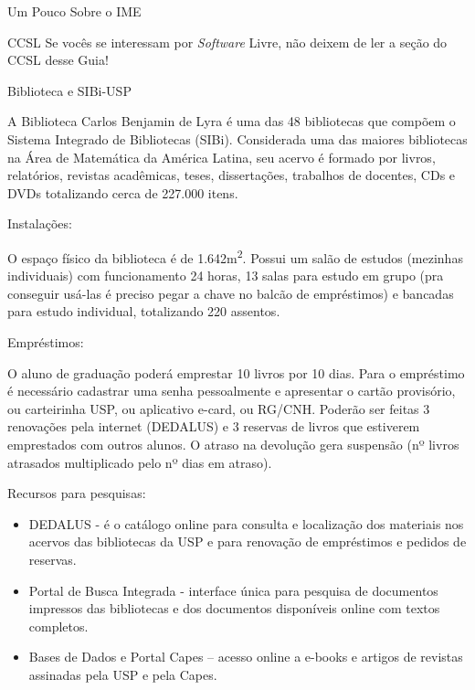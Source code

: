 \begin{secao}{Um Pouco Sobre o IME}
\begin{subsecao}{CCSL}
Se vocês se interessam por \textit{Software} Livre, não deixem de ler a seção
do CCSL desse Guia!

\end{subsecao}



\begin{subsecao}{Biblioteca e SIBi-USP}

A Biblioteca Carlos Benjamin de Lyra é uma das 48 bibliotecas que compõem o Sistema Integrado de Bibliotecas (SIBi). Considerada uma das maiores bibliotecas na Área de Matemática da América Latina, seu acervo é formado por livros, relatórios, revistas acadêmicas, teses, dissertações, trabalhos de docentes, CDs e DVDs totalizando cerca de 227.000 itens. 

\begin{subsubsecao}{Instalações:}

O espaço físico da biblioteca é de 1.642m\textsuperscript{2}. Possui um salão de estudos (mezinhas individuais) com funcionamento 24 horas, 13 salas para estudo em grupo (pra conseguir usá-las é preciso pegar a chave no balcão de empréstimos) e bancadas para estudo individual, totalizando 220 assentos.
\end{subsubsecao}

\begin{subsubsecao}{Empréstimos:}

O aluno de graduação poderá emprestar 10 livros por 10 dias. Para o empréstimo é necessário cadastrar uma senha pessoalmente e apresentar o cartão provisório, ou carteirinha USP, ou aplicativo e-card, ou RG/CNH. Poderão ser feitas 3 renovações pela internet (DEDALUS) e 3 reservas de livros que estiverem emprestados com outros alunos. O atraso na devolução gera suspensão (nº livros atrasados multiplicado pelo nº dias em atraso). 
\end{subsubsecao}

\begin{subsubsecao}{Recursos para pesquisas:}
\begin{itemize}
    \item DEDALUS - é o catálogo online para consulta e localização dos materiais nos acervos das bibliotecas da USP e para renovação de empréstimos e pedidos de reservas. 
    \item Portal de Busca Integrada - interface única para pesquisa de documentos impressos das bibliotecas e dos documentos disponíveis online com textos completos. 
    \item Bases de Dados e Portal Capes – acesso online a e-books e artigos de revistas assinadas pela USP e pela Capes.
    \end{itemize}
\end{subsubsecao}


\end{subsecao}
\end{secao}
